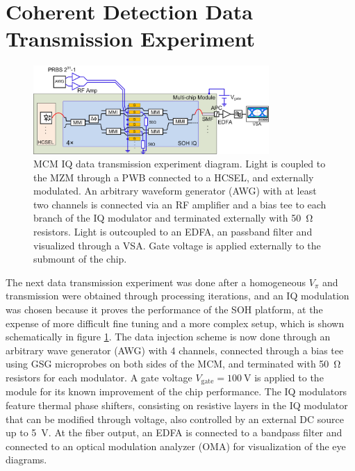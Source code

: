 \section{Coherent Detection Data Transmission Experiment}

\begin{figure}[!ht]
\centering
  \includegraphics[width=0.8\textwidth]{visio/MCM-LO-IQ-DTE}
  \caption{MCM IQ data transmission experiment diagram. Light is coupled to the MZM through a PWB connected to a HCSEL, and externally modulated. An arbitrary waveform generator (AWG) with at least two channels is connected via an RF amplifier and a bias tee to each branch of the IQ modulator and terminated externally with \SI{50}{\ohm} resistors. Light is outcoupled to an EDFA, an passband filter and visualized through a VSA. Gate voltage is applied externally to the submount of the chip.}
  \label{fig:mcm-005-DTE-IQ}
\end{figure}

The next data transmission experiment was done after a homogeneous $V_\pi$ and transmission were obtained through processing iterations, and an IQ modulation was chosen because it proves the performance of the SOH platform, at the expense of more difficult fine tuning and a more complex setup, which is shown schematically in figure \ref{fig:mcm-005-DTE-IQ}. The data injection scheme is now done through an arbitrary wave generator (AWG) with 4 channels, connected through a bias tee using GSG microprobes on both sides of the MCM, and terminated with \SI{50}{\ohm} resistors for each modulator. A gate voltage $V_\text{gate}=\SI{100}{\volt}$ is applied to the module for its known improvement of the chip performance. The IQ modulators feature thermal phase shifters, consisting on resistive layers in the IQ modulator that can be modified through voltage, also controlled by an external DC source up to \SI{5}{\volt}. At the fiber output, an EDFA is connected to a bandpass filter and connected to an optical modulation analyzer (OMA) for visualization of the eye diagrams.

